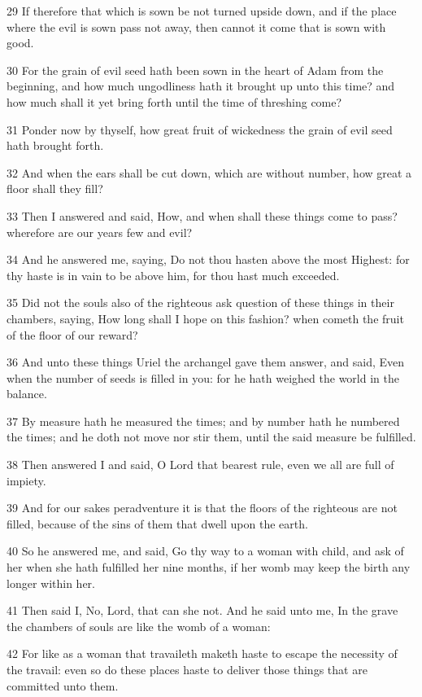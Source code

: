 \par 29 If therefore that which is sown be not turned upside down, and if the place where the evil is sown pass not away, then cannot it come that is sown with good.
\par 30 For the grain of evil seed hath been sown in the heart of Adam from the beginning, and how much ungodliness hath it brought up unto this time? and how much shall it yet bring forth until the time of threshing come?
\par 31 Ponder now by thyself, how great fruit of wickedness the grain of evil seed hath brought forth.
\par 32 And when the ears shall be cut down, which are without number, how great a floor shall they fill?
\par 33 Then I answered and said, How, and when shall these things come to pass? wherefore are our years few and evil?
\par 34 And he answered me, saying, Do not thou hasten above the most Highest: for thy haste is in vain to be above him, for thou hast much exceeded.
\par 35 Did not the souls also of the righteous ask question of these things in their chambers, saying, How long shall I hope on this fashion? when cometh the fruit of the floor of our reward?
\par 36 And unto these things Uriel the archangel gave them answer, and said, Even when the number of seeds is filled in you: for he hath weighed the world in the balance.
\par 37 By measure hath he measured the times; and by number hath he numbered the times; and he doth not move nor stir them, until the said measure be fulfilled.
\par 38 Then answered I and said, O Lord that bearest rule, even we all are full of impiety.
\par 39 And for our sakes peradventure it is that the floors of the righteous are not filled, because of the sins of them that dwell upon the earth.
\par 40 So he answered me, and said, Go thy way to a woman with child, and ask of her when she hath fulfilled her nine months, if her womb may keep the birth any longer within her.
\par 41 Then said I, No, Lord, that can she not. And he said unto me, In the grave the chambers of souls are like the womb of a woman:
\par 42 For like as a woman that travaileth maketh haste to escape the necessity of the travail: even so do these places haste to deliver those things that are committed unto them.
